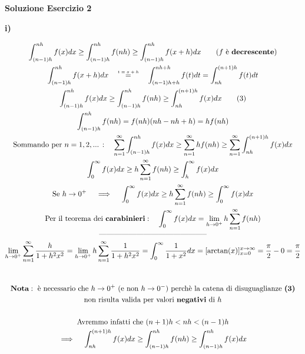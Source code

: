\documentclass[11pt,reqno]{amsart}
\begin{document}
\newpage

\centerline{\bf Soluzione Esercizio 2 }
{\bf i)}

\begin{gather*}
  \int_{(n-1)h}^{nh} f(x)dx \geq \int_{(n-1)h}^{nh} f(nh) \geq \int_{(n-1)h}^{nh} f(x+h)dx \quad \quad \text{(} f \text{ è } \textbf{decrescente} \text{)}\\
  \int_{(n-1)h}^{nh} f(x+h)dx \quad \quad \stackrel{\mathclap{\tiny\mbox{$t=x+h$}}}{=} \quad \quad \int_{(n-1)h+h}^{nh + h} f(t)dt = \int_{nh}^{(n+1)h} f(t)dt\\
  \int_{(n-1)h}^{nh} f(x)dx \geq \int_{(n-1)h}^{nh} f(nh) \geq \int_{nh}^{(n+1)h} f(x)dx \tag{3}\\
  \int_{(n-1)h}^{nh} f(nh) = f(nh) (nh - nh + h) = hf(nh)\\
  \text{Sommando per } n = 1,2,...\,: \quad \sum_{n = 1}^{\infty} \int_{(n-1)h}^{nh} f(x)dx \geq \sum_{n = 1}^{\infty} hf(nh) \geq \sum_{n = 1}^{\infty} \int_{nh}^{(n+1)h} f(x)dx\\
  \int_{0}^{\infty} f(x)dx \geq h \sum_{n = 1}^{\infty} f(nh) \geq \int_{h}^{\infty} f(x)dx\\
  \text{Se } h \to 0^{+} \quad \implies \quad \int_{0}^{\infty} f(x)dx \geq h \sum_{n = 1}^{\infty} f(nh) \geq \int_{0}^{\infty} f(x)dx\\
  \text{Per il teorema dei } \textbf{carabinieri}: \quad \int_{0}^{\infty} f(x)dx = \lim_{h \to 0^{+}} h \sum_{n = 1}^{\infty} f(nh)\\
  \text{--------------------------------------------}\\
  \lim_{h \to 0^{+}} \sum_{n = 1}^{\infty} \frac{h}{1 + h^2x^2} = \lim_{h \to 0^{+}} h \sum_{n = 1}^{\infty} \frac{1}{1 + h^2x^2} = \int_{0}^{\infty} \frac{1}{1 + x^2}dx = [\arctan(x)]_{x=0}^{x \to \infty} = \frac{\pi}{2} - 0 = \frac{\pi}{2}\\\\\\
  \textbf{Nota}: \text{ è necessario che } h \to 0^{+} \text{ (e non } h \to 0^{-} \text{) perchè la catena di disuguaglianze } \textbf{(3)}\\
  \text{non risulta valida per valori } \textbf{negativi} \text{ di } h\\\\
  \text{Avremmo infatti che } (n+1)h < nh < (n-1)h\\
  \implies \quad \int_{nh}^{(n+1)h} f(x)dx \geq \int_{(n-1)h}^{nh} f(nh) \geq \int_{(n-1)h}^{nh} f(x)dx
\end{gather*}
\end{document}
